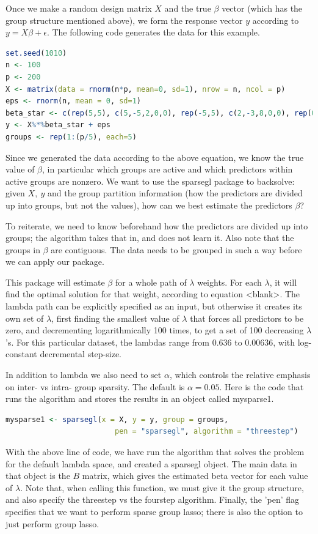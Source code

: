 \documentclass[12pt]{article}
\begin{document}
Once we make a random design matrix $X$ and the true $\beta$ vector (which has the group structure mentioned above), we form the response vector $y$ according to $y=X\beta + \epsilon$. The following code generates the data for this example.

\begin{lstlisting}[language=R]
set.seed(1010)
n <- 100
p <- 200
X <- matrix(data = rnorm(n*p, mean=0, sd=1), nrow = n, ncol = p)
eps <- rnorm(n, mean = 0, sd=1)
beta_star <- c(rep(5,5), c(5,-5,2,0,0), rep(-5,5), c(2,-3,8,0,0), rep(0,(p-20)))
y <- X%*%beta_star + eps
groups <- rep(1:(p/5), each=5)
\end{lstlisting}

Since we generated the data according to the above equation, we know the true value of $\beta$, in particular which groups are active and which predictors within active groups are nonzero. We want to use the sparsegl package to backsolve: given $X,\ y$ and the group partition information (how the predictors are divided up into groups, but not the values), how can we best estimate the predictors $\beta$?

To reiterate, we need to know beforehand how the predictors are divided up into groups; the algorithm takes that in, and does not learn it. Also note that the groups in $\beta$ are contiguous. The data needs to be grouped in such a way before we can apply our package.

This package will estimate $\beta$ for a whole path of $\lambda$ weights. For each $\lambda$, it will find the optimal solution for that weight, according to equation <blank>. The lambda path can be explicitly specified as an input, but otherwise it creates its own set of $\lambda$, first finding the smallest value of $\lambda$ that forces all predictors to be zero, and decrementing logarithmically 100 times, to get a set of 100 decreasing $\lambda$'s. For this particular dataset, the lambdas range from $0.636$ to $0.00636$, with log-constant decremental step-size.

In addition to lambda we also need to set $\alpha$, which controls the relative emphasis on inter- vs intra- group sparsity. The default is $\alpha = 0.05$. Here is the code that runs the algorithm and stores the results in an object called mysparse1.

\begin{lstlisting}[language=R]
mysparse1 <- sparsegl(x = X, y = y, group = groups,
                         pen = "sparsegl", algorithm = "threestep")
\end{lstlisting}
With the above line of code, we have run the algorithm that solves the problem for the default lambda space, and created a sparsegl object. The main data in that object is the $B$ matrix, which gives the estimated beta vector for each value of $\lambda$. Note that, when calling this function, we must give it the group structure, and also specify the threestep vs the fourstep algorithm. Finally, the 'pen' flag specifies that we want to perform sparse group lasso; there is also the option to just perform group lasso.
\end{document}
